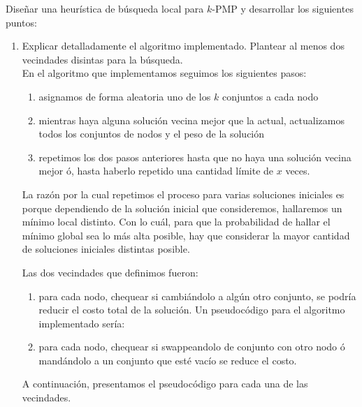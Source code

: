 \documentclass[11pt, a4paper, twoside]{article}
\begin{document}
	Diseñar una heurística de búsqueda local para $k$-PMP y desarrollar los siguientes puntos:
    \begin{enumerate}
    
		\item Explicar detalladamente el algoritmo implementado. Plantear al menos dos vecindades disintas
		para la búsqueda. \\
		En el algoritmo que implementamos seguimos los siguientes pasos:
		\begin{enumerate}
			\item asignamos de forma aleatoria uno de los $k$ conjuntos a cada nodo
			\item mientras haya alguna solución vecina mejor que la actual, actualizamos todos los
			      conjuntos de nodos y el peso de la solución
			\item repetimos los dos pasos anteriores hasta que no haya una solución vecina mejor ó, hasta
			      haberlo repetido una cantidad límite de $x$ veces.
		\end{enumerate}
		
		La razón por la cual repetimos el proceso para varias soluciones iniciales es porque dependiendo
		de la solución inicial que consideremos, hallaremos un mínimo local distinto. Con lo cuál, para
		que la probabilidad de hallar el mínimo global sea lo más alta posible, hay que considerar 
		la mayor cantidad de soluciones iniciales distintas posible.
		
		Las dos vecindades que definimos fueron:
		\begin{enumerate}
			\item para cada nodo, chequear si cambiándolo a algún otro conjunto, se podría reducir el costo
			      total de la solución. Un pseudocódigo para el algoritmo implementado sería:
			\item para cada nodo, chequear si swappeandolo de conjunto con otro nodo ó mandándolo a un conjunto que esté
			      vacío se reduce el costo.
		\end{enumerate}
		
		A continuación, presentamos el pseudocódigo para cada una de las vecindades.
		
		  \begin{algorithm}
			  

\end{algorithm}
\end{enumerate}
\end{document}
